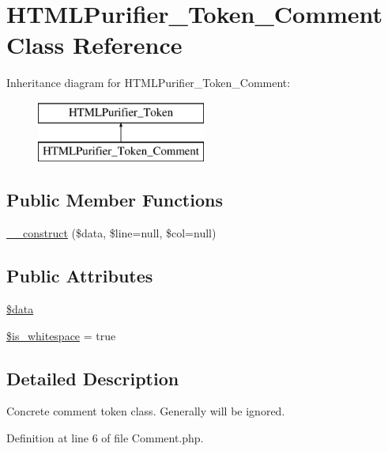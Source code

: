 \hypertarget{classHTMLPurifier__Token__Comment}{\section{H\+T\+M\+L\+Purifier\+\_\+\+Token\+\_\+\+Comment Class Reference}
\label{classHTMLPurifier__Token__Comment}
}
Inheritance diagram for H\+T\+M\+L\+Purifier\+\_\+\+Token\+\_\+\+Comment\+:\begin{figure}[H]
\begin{center}
\leavevmode
\includegraphics[height=2.000000cm]{classHTMLPurifier__Token__Comment}
\end{center}
\end{figure}
\subsection*{Public Member Functions}
\begin{DoxyCompactItemize}
\item 
\hyperlink{classHTMLPurifier__Token__Comment_a15b8b99e961a06dd476946e849bb952e}{\+\_\+\+\_\+construct} (\$data, \$line=null, \$col=null)
\end{DoxyCompactItemize}
\subsection*{Public Attributes}
\begin{DoxyCompactItemize}
\item 
\hyperlink{classHTMLPurifier__Token__Comment_ad468b28dbb352c47f4250539d4bd6a64}{\$data}
\item 
\hyperlink{classHTMLPurifier__Token__Comment_a50eee338dd6a4749b5c9224e12a8dede}{\$is\+\_\+whitespace} = true
\end{DoxyCompactItemize}


\subsection{Detailed Description}
Concrete comment token class. Generally will be ignored. 

Definition at line 6 of file Comment.\+php.



